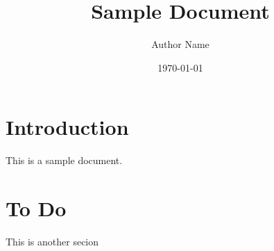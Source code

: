 \documentclass{lib-en}
\begin{document}
\title{Sample Document}
\author{Author Name}
\date{\today}

\maketitle


\section{Introduction}
This is a sample document.
\section{To Do}
This is another secion

\newpage

\end{document}
